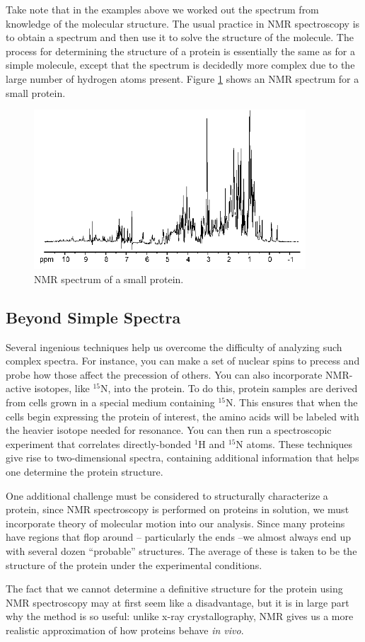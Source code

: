 Take note that in the examples above we worked out the spectrum from knowledge of the molecular structure.  The usual practice in NMR spectroscopy is to obtain a spectrum and then use it to solve the structure of the molecule.  The process for determining the structure of a protein is essentially the same as for a simple molecule, except that the spectrum is decidedly more complex due to the large number of hydrogen atoms present.  Figure \ref{Fig9-23} shows an NMR spectrum for a small protein.
\begin{figure}[!htb]
	\centering
	\includegraphics[width=4.0in]{./figures/Topic9/Fig9-23.png}
	\caption{NMR spectrum of a small protein.}
 	\label{Fig9-23}
\end{figure} 

\subsection{Beyond Simple Spectra}

Several ingenious techniques help us overcome the difficulty of analyzing such complex spectra.  For instance, you can make a set of nuclear spins to precess and probe how those affect the precession of others. You can also incorporate NMR-active isotopes, like $^{15}$N, into the protein.  To do this, protein samples are derived from cells grown in a special medium containing $^{15}$N.  This ensures that when the cells begin expressing the protein of interest, the amino acids will be labeled with the heavier isotope needed for resonance.  You can then run a spectroscopic experiment that correlates directly-bonded $^{1}$H and $^{15}$N atoms.  These techniques give rise to two-dimensional spectra, containing additional information that helps one determine the protein structure.

One additional challenge must be considered to structurally characterize a protein, since NMR spectroscopy is performed on proteins in solution, we must incorporate theory of molecular motion into our analysis.  Since many proteins have regions that flop around -- particularly the ends --we almost always end up with several dozen “probable” structures.  The average of these is taken to be the structure of the protein under the experimental conditions.

The fact that we cannot determine a definitive structure for the protein using NMR spectroscopy may at first seem like a disadvantage, but it is in large part why the method is so useful: unlike x-ray crystallography, NMR gives us a more realistic approximation of how proteins behave {\it in vivo}. 
